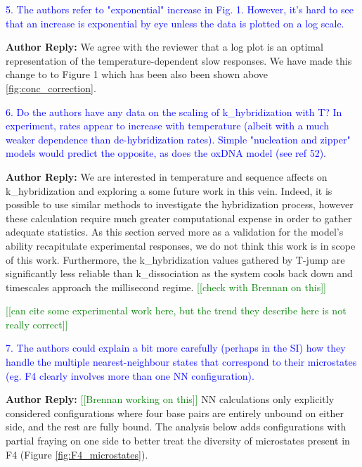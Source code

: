 \documentclass[11pt,a4paper]{letter} %
\newcommand*{\noteg}[1]{\textcolor{green}{[[#1]]}}		%
\begin{document}
\textcolor{blue}{5. The authors refer to "exponential" increase in Fig. 1. However, it's hard to see that an increase is exponential by eye unless the data is plotted on a log scale.}

\textbf{Author Reply:}   We agree with the reviewer that a log plot is an optimal representation of the temperature-dependent slow responses. We have made this change to to Figure 1 which has been also been shown above \ref{fig:conc_correction}.

\textcolor{blue}{6. Do the authors have any data on the scaling of k\_hybridization with T? In experiment, rates appear to increase with temperature (albeit with a much weaker dependence than de-hybridization rates). Simple "nucleation and zipper" models would predict the opposite, as does the oxDNA model (see ref 52).}

\textbf{Author Reply:}   We are interested in temperature and sequence affects on  k\_hybridization and exploring a some future work in this vein. Indeed, it is possible to use similar methods to investigate the hybridization process, however these calculation require much greater computational expense in order to gather adequate statistics. As this section served more as a validation for the model’s ability recapitulate experimental responses, we do not think this work is in scope of this work. Furthermore, the k\_hybridization values gathered by T-jump are significantly less reliable than k\_dissociation as the system cools back down and timescales approach the millisecond regime. \noteg{check with Brennan on this}

\noteg{can cite some experimental work here, but the trend they describe here is not really correct}

\textcolor{blue}{7. The authors could explain a bit more carefully (perhaps in the SI) how they handle the multiple nearest-neighbour states that correspond to their microstates (eg. F4 clearly involves more than one NN configuration).}

\textbf{Author Reply:}   \noteg{Brennan working on this}  NN calculations only explicitly considered configurations where four base pairs are entirely unbound on either side, and the rest are fully bound. The analysis below adds configurations with partial fraying on one side to better treat the diversity of microstates present in F4 (Figure \ref{fig:F4_microstates}).
\end{document}
